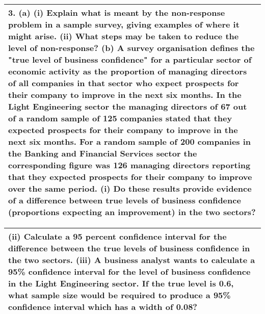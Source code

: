 \documentclass[a4paper,12pt]{article}
\begin{document}
\begin{table}[ht!]
 \centering
 \begin{tabular}{|p{15cm}|}
 \hline  
3. (a) (i) Explain what is meant by the non-response problem in a sample survey, giving examples of where it might arise.
(ii) What steps may be taken to reduce the level of non-response?
(b) A survey organisation defines the "true level of business confidence" for a particular sector of economic activity as the proportion of managing directors of all companies in that sector who expect prospects for their company to improve in the next six months.
In the Light Engineering sector the managing directors of 67 out of a random sample of 125 companies stated that they expected prospects for their company to improve in the next six months. For a random sample of 200 companies in the Banking and Financial Services sector the corresponding figure was 126 managing directors reporting that they expected prospects for their company to improve over the same period.
(i) Do these results provide evidence of a difference between true levels of business confidence (proportions expecting an improvement) in the two sectors?

\\ 
\hline
 \end{tabular}
\end{table}
\begin{table}[ht!]
 \centering
 \begin{tabular}{|p{15cm}|}
 \hline  
(ii) Calculate a 95 percent confidence interval for the difference between the true levels of business confidence in the two sectors.
(iii) A business analyst wants to calculate a 95\% confidence interval for the level of business confidence in the Light Engineering sector. If the true level is 0.6, what sample size would be required to produce a 95\% confidence interval which has a width of 0.08?\\ \hline
  \end{tabular}
\end{table}
\end{document}
